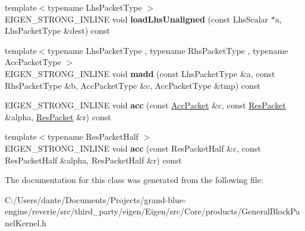 \begin{DoxyCompactItemize}
\item 
\mbox{\label{class_eigen_1_1internal_1_1gebp__traits_a7a8bf55c8af443448a3f95cd1afecfdf}} 
{\footnotesize template$<$typename Lhs\+Packet\+Type $>$ }\\E\+I\+G\+E\+N\+\_\+\+S\+T\+R\+O\+N\+G\+\_\+\+I\+N\+L\+I\+NE void {\bfseries load\+Lhs\+Unaligned} (const Lhs\+Scalar $\ast$a, Lhs\+Packet\+Type \&dest) const
\item 
\mbox{\label{class_eigen_1_1internal_1_1gebp__traits_a34a49fe7eba0d98b4fb04e2303a17935}} 
{\footnotesize template$<$typename Lhs\+Packet\+Type , typename Rhs\+Packet\+Type , typename Acc\+Packet\+Type $>$ }\\E\+I\+G\+E\+N\+\_\+\+S\+T\+R\+O\+N\+G\+\_\+\+I\+N\+L\+I\+NE void {\bfseries madd} (const Lhs\+Packet\+Type \&a, const Rhs\+Packet\+Type \&b, Acc\+Packet\+Type \&c, Acc\+Packet\+Type \&tmp) const
\item 
\mbox{\label{class_eigen_1_1internal_1_1gebp__traits_a52b30a1314c29a3396bbaa44add57646}} 
E\+I\+G\+E\+N\+\_\+\+S\+T\+R\+O\+N\+G\+\_\+\+I\+N\+L\+I\+NE void {\bfseries acc} (const \mbox{\hyperlink{struct_eigen_1_1internal_1_1true__type}{Acc\+Packet}} \&c, const \mbox{\hyperlink{struct_eigen_1_1internal_1_1true__type}{Res\+Packet}} \&alpha, \mbox{\hyperlink{struct_eigen_1_1internal_1_1true__type}{Res\+Packet}} \&r) const
\item 
\mbox{\label{class_eigen_1_1internal_1_1gebp__traits_a29ddd7548d8516711c78c049d9d89aa7}} 
{\footnotesize template$<$typename Res\+Packet\+Half $>$ }\\E\+I\+G\+E\+N\+\_\+\+S\+T\+R\+O\+N\+G\+\_\+\+I\+N\+L\+I\+NE void {\bfseries acc} (const Res\+Packet\+Half \&c, const Res\+Packet\+Half \&alpha, Res\+Packet\+Half \&r) const
\end{DoxyCompactItemize}


The documentation for this class was generated from the following file\+:\begin{DoxyCompactItemize}
\item 
C\+:/\+Users/dante/\+Documents/\+Projects/grand-\/blue-\/engine/reverie/src/third\+\_\+party/eigen/\+Eigen/src/\+Core/products/General\+Block\+Panel\+Kernel.\+h\end{DoxyCompactItemize}
